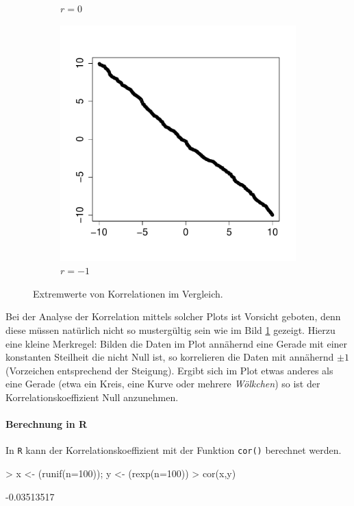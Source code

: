 \begin{figure}[h!]
\begin{subfigure}[b]{0.3\textwidth}
\caption{$r=0$}
\end{subfigure}
\begin{subfigure}[b]{0.3\textwidth}
\includegraphics{begriffe-017}
\caption{$r=-1$}
\end{subfigure}
\caption{Extremwerte von Korrelationen im Vergleich.}
\label{fig:korrelation}
\end{figure}

\noindent
Bei der Analyse der Korrelation mittels solcher Plots ist Vorsicht
geboten, denn diese müssen natürlich nicht so mustergültig sein wie im 
Bild \ref{fig:korrelation} gezeigt. 
Hierzu eine kleine Merkregel: Bilden die
Daten im Plot annähernd eine Gerade mit
einer konstanten Steilheit die nicht Null ist, so korrelieren die Daten
mit annähernd $\pm1$ (Vorzeichen entsprechend der Steigung).
Ergibt sich im Plot etwas anderes als eine Gerade (etwa ein Kreis, eine
Kurve oder mehrere \emph{Wölkchen}) so ist der Korrelationskoeffizient
Null anzunehmen.

\paragraph{Berechnung in R}
In \lstinline{R} kann der Korrelationskoeffizient mit der Funktion
\lstinline{cor()} berechnet werden.

\begin{Schunk}
\begin{Sinput}
> x <- (runif(n=100)); y <- (rexp(n=100))
> cor(x,y)
\end{Sinput}
\begin{Soutput}
[1] -0.03513517
\end{Soutput}
\end{Schunk}
